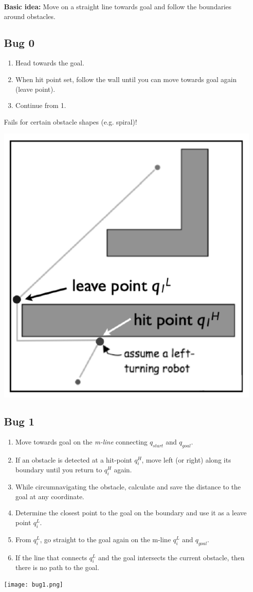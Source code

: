 \begin{multicols*}{2}
\textbf{Basic idea:} Move on a straight line towards goal and follow the boundaries around obstacles.

\subsection{Bug 0}
\begin{enumerate}
	\item Head towards the goal.
	\item When hit point set, follow the wall until you can move towards goal again (leave point).
	\item Continue from 1.
\end{enumerate}
Fails for certain obstacle shapes (e.g. spiral)!

\begin{center}
\includegraphics[width=0.4\columnwidth]{bug0.png}
\end{center}

\subsection{Bug 1}
\begin{enumerate}
	\item Move towards goal on the \textit{m-line} connecting $q_{start}$ and $q_{goal}$.
	\item If an obstacle is detected at a hit-point $q^H_i$, move left (or right) along its boundary until you return to $q^H_i$ again.
	\item While circumnavigating the obstacle, calculate and save the distance to the goal at any coordinate.
	\item Determine the closest point to the goal on the boundary and use it as a leave point $q^L_i$.
	\item From $q^L_i$, go straight to the goal again on the m-line $q^L_i$ and $q_{goal}$.
	\item If the line that connects $q^L_i$ and the goal intersects the current obstacle, then there is no path to the goal.
\end{enumerate}
\begin{center}
\texttt{[image: bug1.png]}
\end{center}


\end{multicols*}
